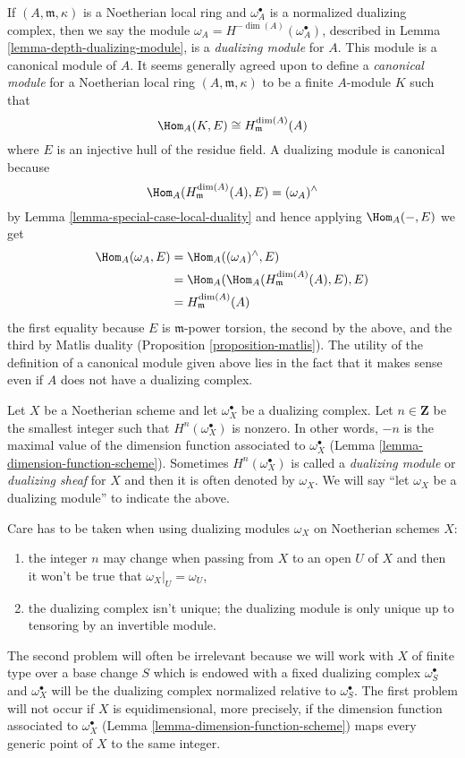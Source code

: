 \noindent
If $(A, \mathfrak m, \kappa)$ is a Noetherian local ring and
$\omega_A^\bullet$ is a normalized dualizing complex, then
we say the module $\omega_A = H^{-\dim(A)}(\omega_A^\bullet)$, described
in Lemma \ref{lemma-depth-dualizing-module}, is a {\it dualizing module}
for $A$. This module is a canonical module of $A$.
It seems generally agreed upon to define a {\it canonical module}
for a Noetherian local ring $(A, \mathfrak m, \kappa)$ to be
a finite $A$-module $K$ such that
$$
\Hom_A(K, E) \cong H^{\dim(A)}_\mathfrak m(A)
$$
where $E$ is an injective hull of the residue field. A dualizing
module is canonical because
$$
\Hom_A(H^{\dim(A)}_\mathfrak m(A), E) = (\omega_A)^\wedge
$$
by Lemma \ref{lemma-special-case-local-duality} and hence applying
$\Hom_A(-, E)$ we get
\begin{align*}
\Hom_A(\omega_A, E)
& =
\Hom_A((\omega_A)^\wedge, E) \\
& =
\Hom_A(\Hom_A(H^{\dim(A)}_\mathfrak m(A), E), E) \\
& = H^{\dim(A)}_\mathfrak m(A)
\end{align*}
the first equality because $E$ is $\mathfrak m$-power torsion, the
second by the above, and the third by Matlis duality
(Proposition \ref{proposition-matlis}). The utility of the definition
of a canonical module given above lies in the fact that it makes sense
even if $A$ does not have a dualizing complex.

\medskip\noindent
Let $X$ be a Noetherian scheme and let $\omega_X^\bullet$ be a
dualizing complex. Let $n \in \mathbf{Z}$ be the smallest integer such that
$H^n(\omega_X^\bullet)$ is nonzero. In other words, $-n$ is the maximal
value of the dimension function associated to $\omega_X^\bullet$
(Lemma \ref{lemma-dimension-function-scheme}).
Sometimes $H^n(\omega_X^\bullet)$
is called a {\it dualizing module} or {\it dualizing sheaf}
for $X$ and then it is often denoted
by $\omega_X$. We will say ``let $\omega_X$ be a dualizing module''
to indicate the above.

\medskip\noindent
Care has to be taken when using dualizing modules $\omega_X$ on Noetherian
schemes $X$:
\begin{enumerate}
\item the integer $n$ may change when passing from $X$ to an open $U$
of $X$ and then it won't be true that $\omega_X|_U = \omega_U$,
\item the dualizing complex isn't unique; the dualizing module
is only unique up to tensoring by an invertible module.
\end{enumerate}
The second problem will often be irrelevant because we will work
with $X$ of finite type over a base change $S$ which is
endowed with a fixed dualizing complex $\omega_S^\bullet$ and
$\omega_X^\bullet$ will be the dualizing complex normalized relative
to $\omega_S^\bullet$.
The first problem will not occur if $X$ is equidimensional, more precisely,
if the dimension function associated to $\omega_X^\bullet$
(Lemma \ref{lemma-dimension-function-scheme})
maps every generic point of $X$ to the same integer.

